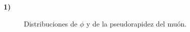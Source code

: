 \documentclass[11pt]{article}
\begin{document}
\textbf{1)}
\begin{figure}[H]
\centering
{}

\caption{Distribuciones de $\phi$ y de la pseudorapidez del muón.}
\label{fig:Prob1A}
\end{figure}
\end{document}
